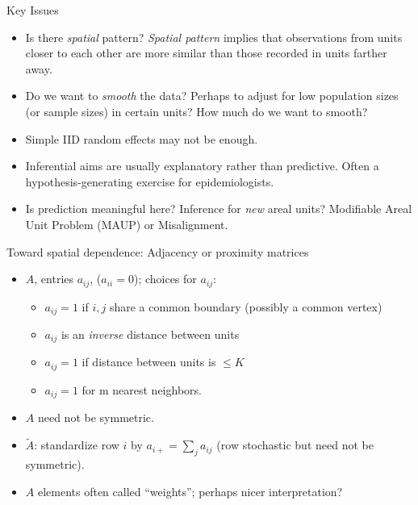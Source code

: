 \documentclass[10pt]{beamer}
\begin{document}
\begin{frame}
Key Issues
	\vspace*{0.3cm}
 \begin{itemize}

\item Is there {\em spatial} pattern? \emph{Spatial pattern} implies that observations from units closer to each other are more similar than those recorded in units farther away.

\item Do we want to {\em smooth} the {data}? Perhaps to adjust for low population sizes (or sample sizes) in certain units? How much do we want to smooth?

\item Simple IID random effects may not be enough.

\item Inferential aims are usually explanatory rather than predictive. Often a hypothesis-generating exercise for epidemiologists.

\item Is prediction meaningful here? Inference for {\em new} areal units? Modifiable Areal Unit Problem (MAUP) or Misalignment.
\end{itemize}

\end{frame}

\begin{frame}{Toward spatial dependence: Adjacency or proximity matrices}
\begin{itemize}\setlength{\itemsep}{0.3cm}
\item $A$, entries $a_{ij}$, ($a_{ii}=0$); choices for $a_{ij}$:

\begin{itemize}
\item
$a_{ij}=1$ if $i,j$ share a common boundary (possibly
a common vertex)
\item
$a_{ij}$ is an \emph{inverse} distance
between units
\item
$a_{ij}=1$ if distance between units is $\le K$
\item
$a_{ij}=1$ for m nearest neighbors.
\end{itemize}

\item $A$ need not be symmetric.

\item $\widetilde{A}$:   standardize row $i$ by $a_{i+}= \sum_{j}
a_{ij}$ (row stochastic but need not be symmetric).

\item $A$ elements often called ``weights''; perhaps nicer interpretation?

\end{itemize} 
\end{frame}
\end{document}
